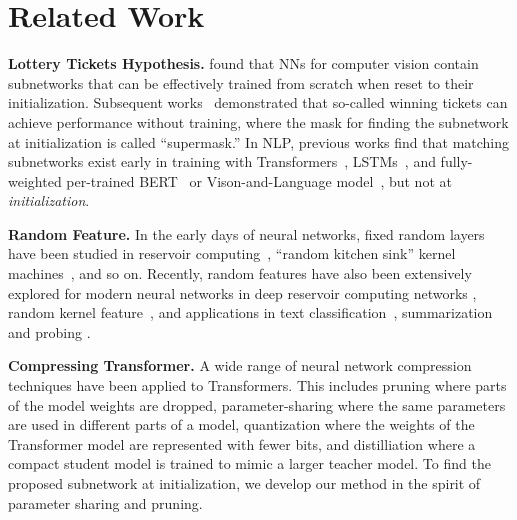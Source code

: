 \section{Related Work}
\vspace{-1mm}
\noindent\textbf{Lottery Tickets Hypothesis.}
\citet{frankle2018lottery} found that NNs for computer vision contain subnetworks that can be effectively trained from scratch when reset to their initialization.
Subsequent works~\citep{Zhou:2019deconstructing,Ramanujan:2020hidden,wortsman2020supermasks} demonstrated that so-called winning tickets can achieve performance without training, where the mask for finding the subnetwork at initialization is called ``supermask.'' 
In NLP, previous works find that matching subnetworks exist early in training with Transformers~\citep{yu2019playing}, LSTMs~\citep{renda2020comparing}, and fully-weighted per-trained BERT~\citep{chen2020lottery,prasanna2020bert} or Vison-and-Language model~\citep{gan2021playing}, but not at \textit{initialization}. 

\noindent\textbf{Random Feature.} 
In the early days of neural networks, fixed random layers~\citep{Baum:1988jc,Schmidt:1992pr,Pao:1994nc} have been studied in reservoir computing~\citep{Maass:2002lsm,Jaeger:2003echostate,Lukovsevivcius:2009reservoir}, ``random kitchen sink'' kernel machines~\citep{Rahimi:2008random,Rahimi:2009kitchen}, and so on. 
Recently, random features have also been extensively explored for modern neural networks in deep reservoir computing networks \citep{Scardapane:2017randomness,Gallicchio:2017echo,shen2020reservoir}, random kernel feature~\citep{peng2021random,Choromanski:2020performer}, and  applications in text classification~\citep{Conneau:2017infersent,Wieting:2019notraining}, summarization \citep{Pilault:2020impressive} and probing \citep{voita2020information}. 

\noindent\textbf{Compressing Transformer.} A wide range of neural network compression techniques have been applied to Transformers. 
This includes pruning  \citep{fan2019reducing,michel2019sixteen,sanh2020movement,yao2021mlpruning} where parts of the model weights are dropped, parameter-sharing \citep{lan2020albert,dehghani2018universal,bai2019deep} where the same
parameters are used in different parts of a model, quantization \citep{shen2020q,li2020train}
where the weights of the Transformer model are represented with fewer bits, and distilliation \citep{sun2020mobilebert,jiao2020tinybert} where a compact student model is trained to mimic a larger teacher model. 
To find the proposed subnetwork at initialization, we develop our method in the spirit of parameter sharing and pruning. 